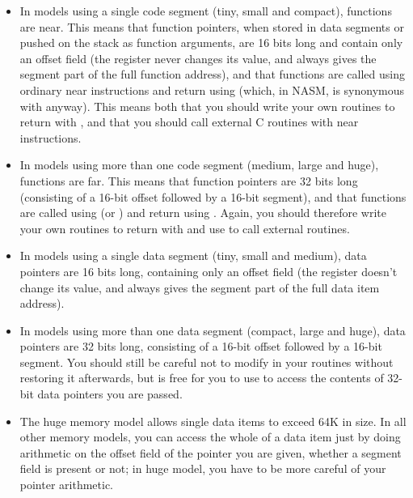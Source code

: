 \begin{itemize}
    \item{In models using a single code segment (tiny, small and compact),
        functions are near. This means that function pointers, when stored
        in data segments or pushed on the stack as function arguments, are
        16 bits long and contain only an offset field (the  register
        never changes its value, and always gives the segment part of the
        full function address), and that functions are called using ordinary
        near  instructions and return using  (which, in
        NASM, is synonymous with  anyway). This means both that you
        should write your own routines to return with , and that you
        should call external C routines with near  instructions.}

    \item{In models using more than one code segment (medium, large and
        huge), functions are far. This means that function pointers are 32
        bits long (consisting of a 16-bit offset followed by a 16-bit
        segment), and that functions are called using  (or
        ) and return using . Again, you should
        therefore write your own routines to return with  and use
         to call external routines.}

    \item{In models using a single data segment (tiny, small and medium),
        data pointers are 16 bits long, containing only an offset field (the
         register doesn't change its value, and always gives the
        segment part of the full data item address).}

    \item{In models using more than one data segment (compact, large and
        huge), data pointers are 32 bits long, consisting of a 16-bit offset
        followed by a 16-bit segment. You should still be careful not to
        modify  in your routines without restoring it afterwards, but
         is free for you to use to access the contents of 32-bit data
        pointers you are passed.}

    \item{The huge memory model allows single data items to exceed 64K in
        size. In all other memory models, you can access the whole of a data
        item just by doing arithmetic on the offset field of the pointer you
        are given, whether a segment field is present or not; in huge model,
        you have to be more careful of your pointer arithmetic.}


\end{itemize}

